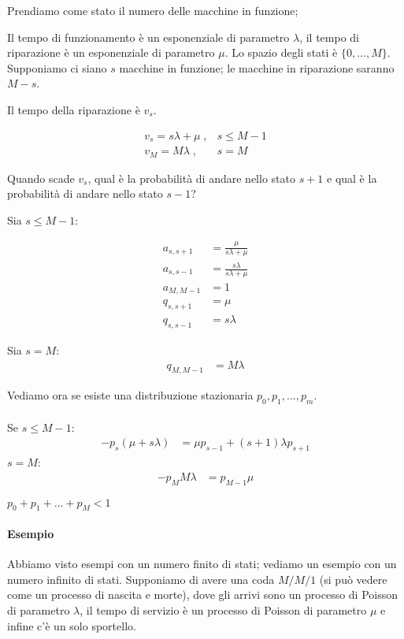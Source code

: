 \documentclass[a4paper,12pt]{book}
\begin{document}
Prendiamo come stato il numero delle macchine in funzione; 

Il tempo di funzionamento è un esponenziale di parametro $\lambda$, il tempo di riparazione è un esponenziale di parametro $\mu$. Lo spazio degli stati è $ \{0, ..., M\} $. Supponiamo ci siano $ s $ macchine in funzione; le macchine in riparazione saranno $ M - s $. 

Il tempo della riparazione è $ v_s $. 

$$ \begin{array}{cc}
	v_s = s\lambda + \mu \; , & s \le M-1 \\
	v_M = M \lambda \; , & s = M
\end{array} $$

Quando scade $ v_s $, qual è la probabilità di andare nello stato $ s+1 $ e qual è la probabilità di andare nello stato $ s-1 $?

Sia $ s \le M-1 $:

\begin{align*}
	a_{s,s+1} & = \frac{\mu}{s\lambda + \mu} \\
	a_{s,s-1} & = \frac{s\lambda}{s\lambda + \mu} \\
	a_{M, M-1} & = 1 \\
	q_{s,s+1} & = \mu \\
	q_{s,s-1} & = s\lambda
\end{align*}

Sia $ s = M $:
\begin{align*}
	q_{M, M-1} & = M\lambda 
\end{align*}

Vediamo ora se esiste una distribuzione stazionaria $ p_0, p_1, ..., p_m  $.
\\\\
Se $ s \le M-1 $:
\begin{align*}
	-p_s(\mu  +s\lambda) & = \mu p_{s-1} + (s+1)\lambda p_{s+1} 
\end{align*}
$ 	s = M $:
\begin{align*}
	-p_M M \lambda & = p_{M-1} \mu 
\end{align*}

$ 	p_0 + p_1 + ... + p_M < 1 $

\paragraph{Esempio}
Abbiamo visto esempi con un numero finito di stati; vediamo un esempio con un numero infinito di stati. Supponiamo di avere una coda $ M/M/1 $ (si può vedere come un processo di nascita e morte), 
dove gli arrivi sono un processo di Poisson di parametro $\lambda$, il tempo di servizio è un processo di Poisson di parametro $\mu$ e infine c'è un solo sportello. 
\end{document}

